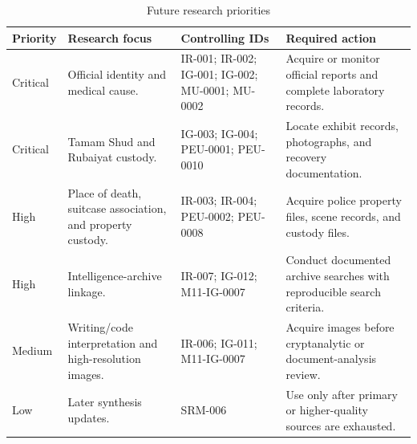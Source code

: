 \begin{table}[htbp]
\centering
\caption{Future research priorities}
\label{tab:chapter11-future-priorities}
\scriptsize
\setlength{\tabcolsep}{2pt}
\renewcommand{\arraystretch}{1.12}
\begin{tabularx}{\textwidth}{>{\raggedright\arraybackslash}p{}>{\raggedright\arraybackslash}p{}>{\raggedright\arraybackslash}p{}>{\raggedright\arraybackslash}X}
\toprule
Priority & Research focus & Controlling IDs & Required action \\
\midrule
Critical & Official identity and medical cause. & IR-001; IR-002; IG-001; IG-002; MU-0001; MU-0002 & Acquire or monitor official reports and complete laboratory records. \\
Critical & Tamam Shud and Rubaiyat custody. & IG-003; IG-004; PEU-0001; PEU-0010 & Locate exhibit records, photographs, and recovery documentation. \\
High & Place of death, suitcase association, and property custody. & IR-003; IR-004; PEU-0002; PEU-0008 & Acquire police property files, scene records, and custody files. \\
High & Intelligence-archive linkage. & IR-007; IG-012; M11-IG-0007 & Conduct documented archive searches with reproducible search criteria. \\
Medium & Writing/code interpretation and high-resolution images. & IR-006; IG-011; M11-IG-0007 & Acquire images before cryptanalytic or document-analysis review. \\
Low & Later synthesis updates. & SRM-006 & Use only after primary or higher-quality sources are exhausted. \\
\bottomrule
\end{tabularx}
\end{table}

